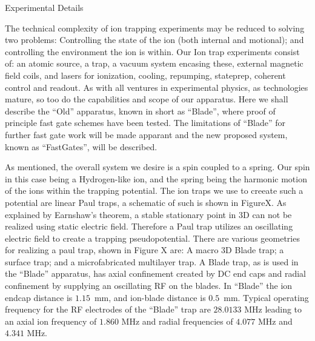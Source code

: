 
Experimental Details


\subtitle{Ion Trapping Apparatus}


The technical complexity of ion trapping experiments may be reduced to
solving two problems: Controlling the state of the ion (both internal
and motional); and controlling the environment the ion is within.
Our Ion trap experiments consist of: an atomic source, a trap, a
vacuum system encasing these, external magnetic field coils, and
lasers for ionization, cooling, repumping, stateprep, coherent
control and readout.
As with all ventures in experimental physics, as technologies mature, so
too do the capabilities and scope of our apparatus.  Here we shall
describe the ``Old'' apparatus, known in short as ``Blade'', where
proof of principle fast gate schemes have been tested. The limitations
of ``Blade'' for further fast gate work will be made apparant and
the new proposed system, known as ``FastGates'', will be described. 

\subtitle{Ion and Trap}

As mentioned, the overall system we desire is a spin coupled to a
spring. Our spin in this case being a Hydrogen-like ion, and the
spring being the harmonic motion of the ions within the trapping
potential. The ion traps we use to creeate such a potential are linear
Paul traps, a schematic of such is shown in FigureX. As explained by
Earnshaw's theorem, a stable stationary point in 3D can not be
realized using static electric field. Therefore a Paul trap utilizes
an oscillating electric field to create a trapping
pseudopotential. There are various geometries for realizing a paul
trap, shown in Figure X are: A macro 3D Blade trap; a surface trap;
and a microfabricated multilayer trap.  A Blade trap, as is used in
the ``Blade'' apparatus, has axial confinement created by DC end caps
and radial confinement by supplying an oscillating RF on the blades.
In ``Blade'' the ion endcap distance is $1.15$~mm, and ion-blade
distance is $0.5$~mm. Typical operating frequency for the RF
electrodes of the ``Blade'' trap are $28.0133$ MHz leading to an axial
ion frequency of $1.860$ MHz and radial frequencies of $4.077$ MHz and
$4.341$ MHz.

